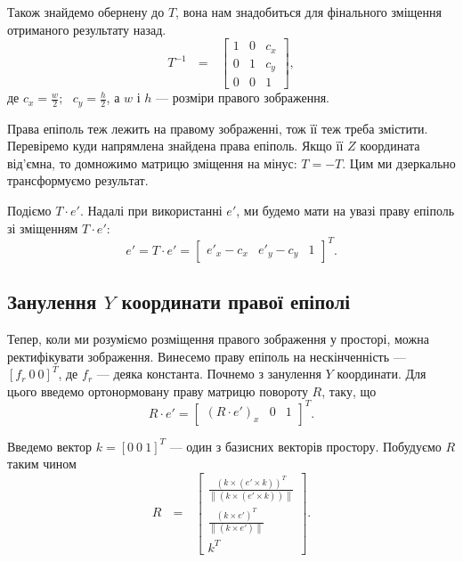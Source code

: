 Також знайдемо обернену до $T$, вона нам знадобиться для фінального зміщення
отриманого результату назад.
\begin{equation}
T^{-1} \:\:\: = \:\:\:\left[
\begin{matrix}
1 & 0 & c_x\\
0 & 1 & c_y\\
0 & 0 & 1\
\end{matrix}
\right],
\end{equation}
де $c_x = \frac{w}{2}; \:\:\: c_y = \frac{h}{2}$, а $w$ і $h$ --- розміри 
правого зображення.

Права епіполь теж лежить на правому зображенні, тож її теж треба змістити.
Перевіремо куди напрямлена знайдена права епіполь. Якщо її $Z$ координата
від'ємна, то домножимо матрицю зміщення на мінус: $T = -T$. Цим ми 
дзеркально трансформуємо результат. 

Подіємо $T \cdot e'$. Надалі при використанні $e'$, ми будемо мати на увазі 
праву епіполь зі зміщенням $T \cdot e'$:
\begin{equation}
e' = T \cdot e' = {
\begin{bmatrix}
e'_x - c_x & e'_y - c_y & 1
\end{bmatrix}
}^T.
\end{equation}


\subsection{Занулення $Y$ координати правої епіполі}
Тепер, коли ми розуміємо розміщення правого зображення у просторі, можна 
ректифікувати зображення. Винесемо праву епіполь на нескінченність --- 
${[f_r \: 0 \: 0]}^T$, де $f_r$ --- деяка константа. Почнемо з занулення $Y$ 
координати. Для цього введемо ортонормовану праву матрицю повороту $R$, 
таку, що 
\begin{equation}
R \cdot e' = {
\begin{bmatrix}
(R \cdot e')_x & 0 & 1
\end{bmatrix}
}^T.
\end{equation}

Введемо вектор $k = {[0 \: 0 \: 1]}^T$ --- один з базисних векторів простору.
Побудуємо $R$ таким чином
\begin{equation}
R \:\:\: = \:\:\:\left[
\begin{matrix}
\frac{{(k \times (e' \times k))}^T}
{\left \| (k \times (e' \times k)) \right \|}\\
\frac{{(k \times e')}^T}{\left \| (k \times e') \right \|}\\
k^T\
\end{matrix}
\right].
\end{equation}

